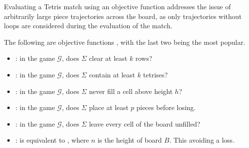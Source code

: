 Evaluating a Tetris match using an objective function addresses the issue of arbitrarily large piece trajectories across the board, as only trajectories without loops are considered during the evaluation of the match.
%
%   

The following are objective functions \cite{TIH, as}, with the last two being the most popular.


\begin{itemize}
  \item {}: in the game $\mathcal{G}$, does $\Sigma$ clear at least $k$ rows?
  \item {}: in the game $\mathcal{G}$, does $\Sigma$ contain at least $k$ tetrises?
  \item {}: in the game $\mathcal{G}$, does $\Sigma$ never fill a cell above height $h$?
  \item {}: in the game $\mathcal{G}$, does $\Sigma$ place at least $p$ pieces before losing.
  \item \clearing: in the game $\mathcal{G}$, does $\Sigma$ leave every cell of the board unfilled?
  \item \survival: is equivalent to , where $n$ is the height of board $B$. This avoiding a loss.
\end{itemize}



